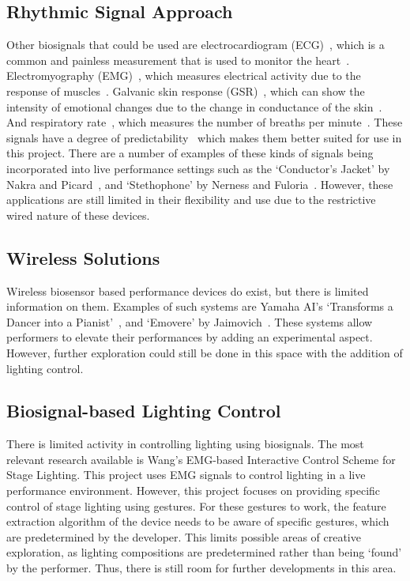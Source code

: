 \subsection{Rhythmic Signal Approach}
Other biosignals that could be used are electrocardiogram (ECG)~\cite{Afonso:1999}\cite{Pan:1985},
which is a common and painless measurement that is used to monitor the heart~\cite{Mayo:2023}.
Electromyography (EMG)~\cite{Tanaka:2002}\cite{Young:2013},
which measures electrical activity due to the response of muscles~\cite{Hopkins:2023}.
Galvanic skin response (GSR)~\cite{Kurniawan:2013},
which can show the intensity of emotional changes due to the change in conductance of the skin~\cite{Farnsworth:2018}.
And respiratory rate~\cite{Carlos:2011},
which measures the number of breaths per minute~\cite{Hopkins2:2023}.
These signals have a degree of predictability~\cite{Tahiroğlu:2008} which makes them better suited for use in this project.
There are a number of examples of these kinds of signals being incorporated into live performance settings such as
the `Conductor's Jacket' by Nakra and Picard~\cite{Nakra:1998}, and `Stethophone' by Nerness and Fuloria~\cite{Nerness:2019}.
However, these applications are still limited in their flexibility and use due to the restrictive wired nature of these devices.

\subsection{Wireless Solutions}
Wireless biosensor based performance devices do exist, but there is limited information on them.
Examples of such systems are Yamaha AI's `Transforms a Dancer into a Pianist'~\cite{Yamaha:2018}, and `Emovere' by Jaimovich~\cite{Jaimovich:2016}.
These systems allow performers to elevate their performances by adding an experimental aspect.
However, further exploration could still be done in this space with the addition of lighting control.

\subsection{Biosignal-based Lighting Control}
There is limited activity in controlling lighting using biosignals.
The most relevant research available is Wang's EMG-based Interactive Control Scheme for Stage Lighting\cite{Wang:2022}.
This project uses EMG signals to control lighting in a live performance environment.
However, this project focuses on providing specific control of stage lighting using gestures.
For these gestures to work, the feature extraction algorithm of the device needs to be aware of specific gestures, which are predetermined by the developer.
This limits possible areas of creative exploration, as lighting compositions are predetermined rather than being `found' by the performer.
Thus, there is still room for further developments in this area.


